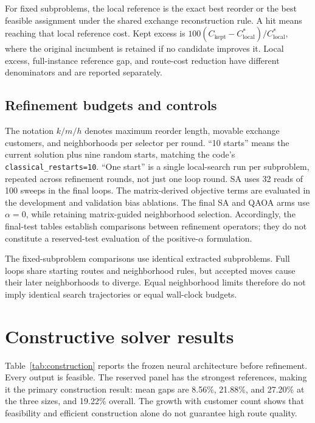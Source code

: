 \documentclass[11pt,a4paper]{article}
\begin{document}
For fixed subproblems, the local reference is the exact best reorder or
the best feasible assignment under the shared exchange reconstruction
rule. A hit means reaching that local reference cost. Kept excess is
$100(C_{\mathrm{kept}}-C_{\mathrm{local}}^*)/C_{\mathrm{local}}^*$,
where the original incumbent is retained if no candidate improves it.
Local excess, full-instance reference gap, and route-cost reduction have
different denominators and are reported separately.

\subsection{Refinement budgets and controls}

The notation $k/m/h$ denotes maximum reorder length, movable exchange
customers, and neighborhoods per selector per round. ``10 starts'' means
the current solution plus nine random starts, matching the code's
\texttt{classical\_restarts=10}. ``One start'' is a single local-search run
per subproblem, repeated across refinement rounds, not just one loop round.
SA uses 32 reads of 100 sweeps in the final loops. The matrix-derived
objective terms are evaluated in the development and validation bias
ablations. The final SA and QAOA arms use $\alpha=0$, while retaining
matrix-guided neighborhood selection. Accordingly, the final-test tables
establish comparisons between refinement operators; they do not constitute
a reserved-test evaluation of the positive-$\alpha$ formulation.

The fixed-subproblem comparisons use identical extracted subproblems. Full
loops share starting routes and neighborhood rules, but accepted moves cause
their later neighborhoods to diverge. Equal neighborhood limits therefore do
not imply identical search trajectories or equal wall-clock budgets.

\section{Constructive solver results}
\label{sec:construction-results}

Table~\ref{tab:construction} reports the frozen neural architecture before
refinement. Every output is feasible. The reserved panel has the strongest
references, making it the primary construction result: mean gaps are
8.56\%, 21.88\%, and 27.20\% at the three sizes, and 19.22\% overall.
The growth with customer count shows that feasibility and efficient
construction alone do not guarantee high route quality.
\end{document}
